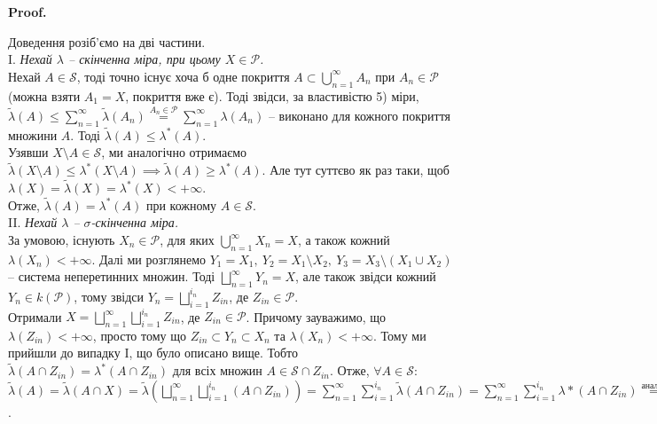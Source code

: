 \documentclass[a4paper, 10pt]{article}
\makeatletter
\theoremstyle{theoremdd}
\renewenvironment{proof}[1][Proof.\\]{\par
\pushQED{\hfill \qed}%
\normalfont \topsep6\p@\@plus6\p@\relax
\trivlist
\item\relax
{\bfseries
#1\@addpunct{.}}\hspace\labelsep\ignorespaces
}{%
\popQED\endtrivlist\@endpefalse
}
\makeatother
\begin{document}
\begin{proof}
Доведення розіб'ємо на дві частини.\\
I. \textit{Нехай $\lambda$ -- скінченна міра, при цьому $X \in \mathcal{P}$.}\\
Нехай $A \in \mathcal{S}$, тоді точно існує хоча б одне покриття $A \subset \displaystyle\bigcup_{n=1}^\infty A_n$ при $A_n \in \mathcal{P}$ (можна взяти $A_1 = X$, покриття вже є). Тоді звідси, за властивістю 5) міри,\\
$\tilde{\lambda}(A) \leq \displaystyle\sum_{n=1}^\infty \tilde{\lambda}(A_n) \overset{A_n \in \mathcal{P}}{=} \sum_{n=1}^\infty \lambda(A_n)$ -- виконано для кожного покриття множини $A$. Тоді $\tilde{\lambda}(A) \leq \lambda^*(A)$.\\
Узявши $X \setminus A \in \mathcal{S}$, ми аналогічно отримаємо $\tilde{\lambda}(X \setminus A) \leq \lambda^*(X \setminus A) \implies \tilde{\lambda}(A) \geq \lambda^*(A)$. Але тут суттєво як раз таки, щоб $\lambda(X) = \tilde{\lambda}(X) = \lambda^*(X) < +\infty$.\\
Отже, $\tilde{\lambda}(A) = \lambda^*(A)$ при кожному $A \in \mathcal{S}$.
\bigskip \\
II. \textit{Нехай $\lambda$ -- $\sigma$-скінченна міра.}\\
За умовою, існують $X_n \in \mathcal{P}$, для яких $\displaystyle\bigcup_{n=1}^\infty X_n = X$, а також кожний $\lambda(X_n) < +\infty$. Далі ми розглянемо $Y_1 = X_1,\ Y_2 = X_1 \setminus X_2,\ Y_3 = X_3 \setminus (X_1 \cup X_2)$ -- система неперетинних множин. Тоді $\displaystyle\bigsqcup_{n=1}^\infty Y_n = X$, але також звідси кожний $Y_n \in k(\mathcal{P})$, тому звідси $Y_n = \displaystyle\bigsqcup_{i=1}^{i_n} Z_{in}$, де $Z_{in} \in \mathcal{P}$.\\
Отримали $X = \displaystyle\bigsqcup_{n=1}^\infty \bigsqcup_{i=1}^{i_n} Z_{in}$, де $Z_{in} \in \mathcal{P}$. Причому зауважимо, що $\lambda(Z_{in}) < +\infty$, просто тому що $Z_{in} \subset Y_n \subset X_n$ та $\lambda(X_n) < +\infty$. Тому ми прийшли до випадку I, що було описано вище. Тобто $\tilde{\lambda}(A \cap Z_{in}) = \lambda^*(A \cap Z_{in})$ для всіх множин $A \in \mathcal{S} \cap Z_{in}$. Отже, $\forall A \in \mathcal{S}:$\\
$\displaystyle\tilde{\lambda}(A) = \tilde{\lambda}(A \cap X) = \tilde{\lambda}\left( \bigsqcup_{n=1}^\infty \bigsqcup_{i=1}^{i_n} (A \cap Z_{in}) \right) = \sum_{n=1}^\infty \sum_{i=1}^{i_n} \tilde{\lambda}(A \cap Z_{in}) = \sum_{n=1}^\infty \sum_{i=1}^{i_n} \lambda*(A \cap Z_{in}) \overset{\text{аналог}}{=} \lambda^*(A)$.
\end{proof}
\end{document}
